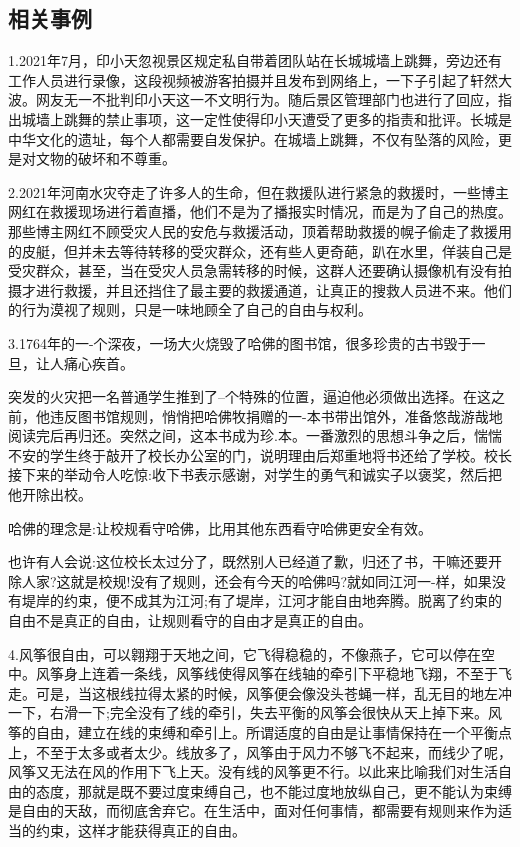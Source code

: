 \documentclass[UTF8]{ctexart}
\begin{document}
\subsection{相关事例}
1.2021年7月，印小天忽视景区规定私自带着团队站在长城城墙上跳舞，旁边还有工作人员进行录像，这段视频被游客拍摄并且发布到网络上，一下子引起了轩然大波。网友无一不批判印小天这一不文明行为。随后景区管理部门也进行了回应，指出城墙上跳舞的禁止事项，这一定性使得印小天遭受了更多的指责和批评。长城是中华文化的遗址，每个人都需要自发保护。在城墙上跳舞，不仅有坠落的风险，更是对文物的破坏和不尊重。\par
2.2021年河南水灾夺走了许多人的生命，但在救援队进行紧急的救援时，一些博主网红在救援现场进行着直播，他们不是为了播报实时情况，而是为了自己的热度。那些博主网红不顾受灾人民的安危与救援活动，顶着帮助救援的幌子偷走了救援用的皮艇，但并未去等待转移的受灾群众，还有些人更奇葩，趴在水里，佯装自己是受灾群众，甚至，当在受灾人员急需转移的时候，这群人还要确认摄像机有没有拍摄才进行救援，并且还挡住了最主要的救援通道，让真正的搜救人员进不来。他们的行为漠视了规则，只是一味地顾全了自己的自由与权利。\par
3.1764年的一-个深夜，一场大火烧毁了哈佛的图书馆，很多珍贵的古书毁于一旦，让人痛心疾首。\par
突发的火灾把一名普通学生推到了--个特殊的位置，逼迫他必须做出选择。在这之前，他违反图书馆规则，悄悄把哈佛牧捐赠的一-本书带出馆外，准备悠哉游哉地阅读完后再归还。突然之间，这本书成为珍.本。一番激烈的思想斗争之后，惴惴不安的学生终于敲开了校长办公室的门，说明理由后郑重地将书还给了学校。校长接下来的举动令人吃惊:收下书表示感谢，对学生的勇气和诚实子以褒奖，然后把他开除出校。\par
哈佛的理念是:让校规看守哈佛，比用其他东西看守哈佛更安全有效。\par
也许有人会说:这位校长太过分了，既然别人已经道了歉，归还了书，干嘛还要开除人家?这就是校规!没有了规则，还会有今天的哈佛吗?就如同江河一-样，如果没有堤岸的约束，便不成其为江河;有了堤岸，江河才能自由地奔腾。脱离了约束的自由不是真正的自由，让规则看守的自由才是真正的自由。\par
4.风筝很自由，可以翱翔于天地之间，它飞得稳稳的，不像燕子，它可以停在空中。风筝身上连着一条线，风筝线使得风筝在线轴的牵引下平稳地飞翔，不至于飞走。可是，当这根线拉得太紧的时候，风筝便会像没头苍蝇一样，乱无目的地左冲一下，右滑一下;完全没有了线的牵引，失去平衡的风筝会很快从天上掉下来。风筝的自由，建立在线的束缚和牵引上。所谓适度的自由是让事情保持在一个平衡点上，不至于太多或者太少。线放多了，风筝由于风力不够飞不起来，而线少了呢，风筝又无法在风的作用下飞上天。没有线的风筝更不行。以此来比喻我们对生活自由的态度，那就是既不要过度束缚自己，也不能过度地放纵自己，更不能认为束缚是自由的天敌，而彻底舍弃它。在生活中，面对任何事情，都需要有规则来作为适当的约束，这样才能获得真正的自由。\par
\end{document}
